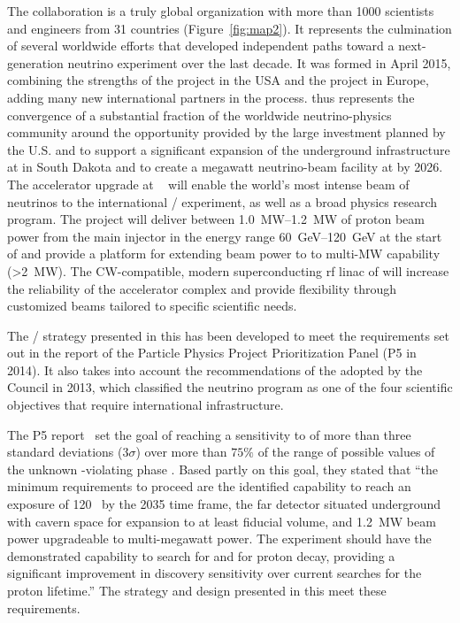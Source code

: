 The  collaboration is a truly global organization with more than \num{1000} scientists and engineers from \num{31} countries (Figure~\ref{fig:map2}). It represents the culmination of several worldwide efforts that developed independent paths toward a next-generation  neutrino experiment over the last decade. It was formed in April 2015, combining the strengths of the  project in the USA and the  project in Europe, adding many new international partners in the process.  thus represents the convergence of a substantial fraction of the worldwide neutrino-physics community around the opportunity provided by the large investment planned by the U.S.  and  to support a significant expansion of the underground infrastructure at  in South Dakota and to create a megawatt neutrino-beam facility at  by 2026. 
The  accelerator upgrade at ~\cite{pip2-2013} will enable the world's most intense beam of neutrinos to the international / experiment, as well as a broad physics research program.  
The  project will deliver between \SIrange{1.0}{1.2}{\MW} of proton beam power from the main injector in the energy range \SIrange{60}{120}{\GeV} at the start of  and provide a platform for extending beam power to  to multi-MW capability (>\SI{2}{\MW}). 
The CW-compatible, modern superconducting rf linac of  will increase the reliability of the  accelerator complex and provide flexibility through customized  beams tailored to specific scientific needs.  


The / strategy presented in this  has been developed to meet the requirements set out in the report of the Particle Physics Project Prioritization Panel (P5 in 2014). It also takes into account the recommendations of the  adopted by the  Council in 2013, which classified the  neutrino program as one of the four scientific objectives that require international infrastructure.


The P5 report~\cite{p5report} set the goal of reaching a sensitivity to  of more than three standard deviations (\num{3}$\sigma$) over more than $75\%$ 
of the range of possible values of the unknown -violating phase \deltacp.
Based partly on this goal, they stated that ``the 
minimum requirements to proceed are the identified capability to reach an exposure 
of \num{120}~\ktMWyr{} by the 2035 time frame, the far detector situated underground 
with cavern space for expansion to at least \fdfiducialmass {} fiducial volume, and \SI{1.2}{MW} 
beam power upgradeable to multi-megawatt power.
The experiment should have the demonstrated 
capability to search for  and for proton decay, providing a significant 
improvement in discovery sensitivity over current searches for the proton lifetime.'' The strategy and design presented in this  meet these requirements.

